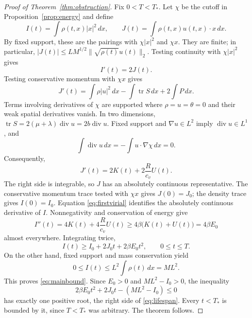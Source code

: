 \documentclass[11pt,letterpaper]{article}
\numberwithin{equation}{section}
\theoremstyle{definition}
\newcommand{\dd}{\,dx}
\newcommand{\Div}{\operatorname{div}}
\newcommand{\norm}[2]{\lVert#1\rVert_{#2}}
\begin{document}
\begin{proof}[Proof of Theorem~\ref{thm:obstruction}]
Fix $0<T<T_*$. Let $\chi$ be the cutoff in
Proposition~\ref{prop:energy} and define
\[
 I(t)=\int\rho(t,x)|x|^2\dd,\qquad
 J(t)=\int\rho(t,x)u(t,x)\cdot x\dd.
\]
By fixed support, these are the pairings with $\chi|x|^2$ and
$\chi x$. They are finite; in particular,
$|J(t)|\le L M^{1/2}\norm{\sqrt{\rho(t)}u(t)}{2}$.
Testing continuity with $\chi|x|^2$ gives
\begin{equation}
 I'(t)=2J(t).
 \label{eq:firstvirial}
\end{equation}
Testing conservative momentum with $\chi x$ gives
\begin{equation}
 J'(t)=\int\rho|u|^2\dd-\int\operatorname{tr}S\dd
                                      +2\int P\dd.
 \label{eq:secondvirial}
\end{equation}
Terms involving derivatives of $\chi$ are supported where
$\rho=u=\theta=0$ and their weak spatial derivatives vanish.
In two dimensions,
$\operatorname{tr}S=2(\mu+\lambda)\Div u=2b\Div u$.
Fixed support and $\nabla u\in L^2$ imply $\Div u\in L^1$, and
\[
 \int\Div u\dd=-\int u\cdot\nabla\chi\dd=0.
\]
Consequently,
\begin{equation}
 J'(t)=2K(t)+2\frac{R}{c_v}U(t).
 \label{eq:momentumvirial}
\end{equation}
The right side is integrable, so $J$ has an absolutely continuous
representative. The conservative momentum trace tested with $\chi x$
gives $J(0)=J_0$; the density trace gives $I(0)=I_0$.
Equation \eqref{eq:firstvirial} identifies the absolutely continuous
derivative of $I$. Nonnegativity and conservation of energy give
\begin{equation}
 I''(t)=4K(t)+4\frac{R}{c_v}U(t)
       \ge4\beta\bigl(K(t)+U(t)\bigr)=4\beta E_0
 \label{eq:virialacceleration}
\end{equation}
almost everywhere. Integrating twice,
\begin{equation}
 I(t)\ge I_0+2J_0t+2\beta E_0t^2,\qquad 0\le t\le T.
 \label{eq:quadraticgrowth}
\end{equation}
On the other hand, fixed support and mass conservation yield
\begin{equation}
 0\le I(t)\le L^2\int\rho(t)\dd=ML^2.
 \label{eq:momentupper}
\end{equation}
This proves \eqref{eq:mainbound}. Since $E_0>0$ and
$ML^2-I_0>0$, the inequality
\[
 2\beta E_0t^2+2J_0t-(ML^2-I_0)\le0
\]
has exactly one positive root, the right side of \eqref{eq:lifespan}.
Every $t<T_*$ is bounded by it, since $T<T_*$ was arbitrary.
The theorem follows.
\end{proof}
\end{document}

